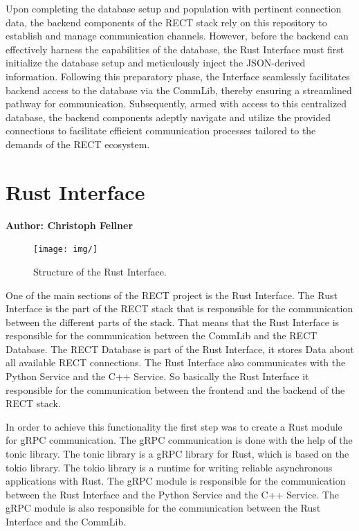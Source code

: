 Upon completing the database setup and population with pertinent connection data, the backend components of the RECT stack rely on this repository to establish and manage 
communication channels. However, before the backend can effectively harness the capabilities of the database, the Rust Interface must first initialize the database setup 
and meticulously inject the JSON-derived information. Following this preparatory phase, the Interface seamlessly facilitates backend access to the database via the CommLib,
thereby ensuring a streamlined pathway for communication. Subsequently, armed with access to this centralized database, the backend components adeptly navigate and utilize
the provided connections to facilitate efficient communication processes tailored to the demands of the RECT ecosystem.

\section{Rust Interface}
\textbf{Author: Christoph Fellner}

\begin{figure}
	\centering

	\texttt{[image: img/]}

	\caption{Structure of the Rust Interface.}
	\label{fig:rust-interface-architecture}
\end{figure}

One of the main sections of the RECT project is the Rust Interface. The Rust Interface is the part of the RECT stack that is responsible for the communication between 
the different parts of the stack. That means that the Rust Interface is responsible for the communication between the CommLib and the RECT Database. The RECT Database is 
part of the Rust Interface, it stores Data about all available RECT connections. The Rust Interface also communicates with the Python Service and the C++ Service. So 
basically the Rust Interface it responsible for the communication between the frontend and the backend of the RECT stack.\newline

In order to achieve this functionality the first step was to create a Rust module for gRPC communication. The gRPC communication is done with the help of the tonic library.
The tonic library is a gRPC library for Rust, which is based on the tokio library. The tokio library is a runtime for writing reliable asynchronous applications with Rust.
The gRPC module is responsible for the communication between the Rust Interface and the Python Service and the C++ Service. The gRPC module is also responsible for the 
communication between the Rust Interface and the CommLib.\newline 

